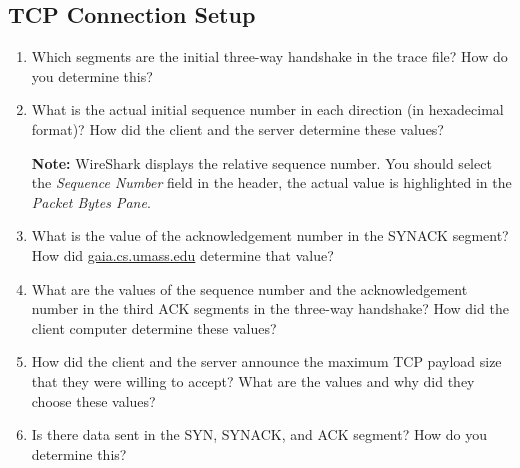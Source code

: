 \subsection{TCP Connection Setup} \label{sec:tcp-con}
\begin{enumerate}
\item Which segments are the initial three-way handshake in the trace
  file? How do you determine this?
\item What is the actual initial sequence number in each direction (in
  hexadecimal format)? How did the client  and the server
  determine these values?

  {\bf Note:} WireShark displays the relative sequence number. You
  should select the {\em Sequence Number} field in the header, the
  actual value is highlighted in the {\em Packet Bytes Pane}.

\item What is the value of the acknowledgement number in the SYNACK
  segment? How did \url{gaia.cs.umass.edu} determine that value?

\item What are the values of the sequence number and the
  acknowledgement number in the third ACK segments in the three-way
  handshake? How did the client computer determine these values?

\item How did the client and the server announce the maximum
  TCP payload size that they were willing to accept? What are the
  values and why did they choose these values?

\item Is there data sent in the SYN, SYNACK, and ACK segment? How do
  you determine this?
\end{enumerate}

